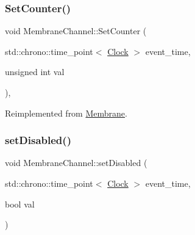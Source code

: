\mbox{\label{classMembraneChannel_a61931feff8f3bb485eeb5c80125bb732}} 
\subsubsection{\texorpdfstring{Set\+Counter()}{SetCounter()}}
{\footnotesize\ttfamily void Membrane\+Channel\+::\+Set\+Counter (\begin{DoxyParamCaption}\item[{std\+::chrono\+::time\+\_\+point$<$ \mbox{\hyperlink{universe_8h_a0ef8d951d1ca5ab3cfaf7ab4c7a6fd80}{Clock}} $>$}]{event\+\_\+time,  }\item[{unsigned int}]{val }\end{DoxyParamCaption})\hspace{0.3cm}{\ttfamily [inline]}, {\ttfamily [virtual]}}



Reimplemented from \mbox{\hyperlink{classMembrane_a4bff43b38d7046867f220392a39cc272}{Membrane}}.

\mbox{\label{classMembraneChannel_aed2055857888506a35c09bdcc265799a}} 
\subsubsection{\texorpdfstring{set\+Disabled()}{setDisabled()}}
{\footnotesize\ttfamily void Membrane\+Channel\+::set\+Disabled (\begin{DoxyParamCaption}\item[{std\+::chrono\+::time\+\_\+point$<$ \mbox{\hyperlink{universe_8h_a0ef8d951d1ca5ab3cfaf7ab4c7a6fd80}{Clock}} $>$}]{event\+\_\+time,  }\item[{bool}]{val }\end{DoxyParamCaption})\hspace{0.3cm}{\ttfamily [inline]}}

\mbox{\label{classMembraneChannel_aaa2d816d3887b6292d995a83130a4834}} 
